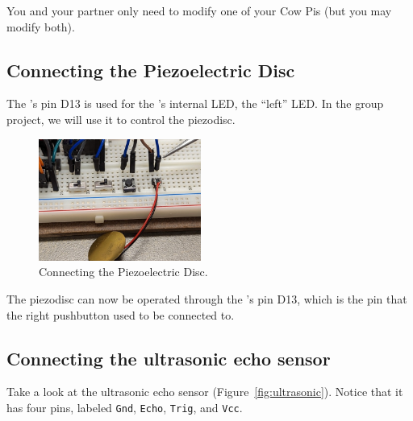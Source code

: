 You and your partner only need to modify one of your Cow Pis (but you may modify both).

\subsection{Connecting the Piezoelectric Disc}

The \developmentboard's pin D13 is used for the \developmentboard's internal LED, the ``left'' LED.
In the group project, we will use it to control the piezodisc.

\begin{description}
\end{description}

\begin{figure}
    \centering
    \includegraphics[height=4cm]{reconfiguration_images/adjust_piezo_wire}
    \caption{\label{fig:insertPiezo} Connecting the Piezoelectric Disc.}
\end{figure}

The piezodisc can now be operated through the \developmentboard's pin D13, which is the pin that the right pushbutton used to be connected to.


\subsection{Connecting the ultrasonic echo sensor}

Take a look at the ultrasonic echo sensor (Figure~\ref{fig:ultrasonic}).
Notice that it has four pins, labeled \texttt{Gnd}, \texttt{Echo}, \texttt{Trig}, and \texttt{Vcc}.

